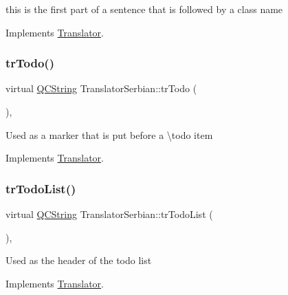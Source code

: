 this is the first part of a sentence that is followed by a class name 

Implements \mbox{\hyperlink{class_translator}{Translator}}.

\mbox{\label{class_translator_serbian_aafb2072e6363c89863e60d55b3ab13fb}} 
\subsubsection{\texorpdfstring{trTodo()}{trTodo()}}
{\footnotesize\ttfamily virtual \mbox{\hyperlink{class_q_c_string}{Q\+C\+String}} Translator\+Serbian\+::tr\+Todo (\begin{DoxyParamCaption}{ }\end{DoxyParamCaption})\hspace{0.3cm}{\ttfamily [inline]}, {\ttfamily [virtual]}}

Used as a marker that is put before a \textbackslash{}todo item 

Implements \mbox{\hyperlink{class_translator}{Translator}}.

\mbox{\label{class_translator_serbian_a52c02e96193db043a4d10ad468bc97e9}} 
\subsubsection{\texorpdfstring{trTodoList()}{trTodoList()}}
{\footnotesize\ttfamily virtual \mbox{\hyperlink{class_q_c_string}{Q\+C\+String}} Translator\+Serbian\+::tr\+Todo\+List (\begin{DoxyParamCaption}{ }\end{DoxyParamCaption})\hspace{0.3cm}{\ttfamily [inline]}, {\ttfamily [virtual]}}

Used as the header of the todo list 

Implements \mbox{\hyperlink{class_translator}{Translator}}.

\mbox{\label{class_translator_serbian_a4e2337dc59e7d631599c9983659c8bf5}} 
